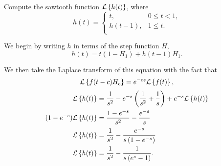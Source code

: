 \documentclass[../hw7]{subfiles}
\begin{document}
Compute the sawtooth function $\mathcal{L}\left\{h(t)\right\}$, where \[h(t)=\begin{cases}
    t, & 0\leq t < 1, \\
    h(t-1), & 1 \leq t. \\
\end{cases}\]

We begin by writing $h$ in terms of the step function $H$,
\[h(t)=t(1-H_1)+h(t-1)H_1.\]

We then take the Laplace transform of this equation with the fact that \[\mathcal{L}\left\{f(t-c)H_c\right\}=e^{-cs}\mathcal{L}\left\{f(t)\right\},\]
\begin{align*}
    \mathcal{L}\left\{h(t)\right\}&=\frac{1}{s^2}-e^{-s}\left( \frac{1}{s^2}+\frac{1}{s} \right)+e^{-s}\mathcal{L}\left\{h(t)\right\} \\
    (1-e^{-s})\mathcal{L}\left\{h(t)\right\}&=\frac{1-e^{-s}}{s^2}-\frac{e^{-s}}{s} \\
    \mathcal{L}\left\{h(t)\right\}&=\frac{1}{s^2}-\frac{e^{-s}}{s\left( 1-e^{-s} \right)} \\
    \mathcal{L}\left\{h(t)\right\}&=\frac{1}{s^2}-\frac{1}{s\left( e^s-1 \right)}. \\
\end{align*}
\end{document}
